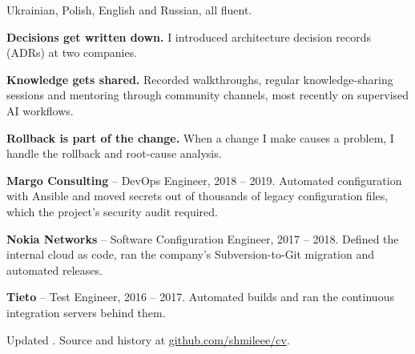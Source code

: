 %
\setlength{\RaggedRightRightskip}{0pt plus 1fil}\raggedright



\smallskip
Ukrainian, Polish, English and Russian, all fluent.

\smallskip
\textbf{Decisions get written down.} I introduced architecture decision
records (ADRs) at two companies.

\smallskip
\textbf{Knowledge gets shared.} Recorded walkthroughs, regular
knowledge-sharing sessions and mentoring through community channels, most
recently on supervised AI workflows.

\smallskip
\textbf{Rollback is part of the change.} When a change I make causes a
problem, I handle the rollback and root-cause analysis.

\smallskip
\textbf{Margo Consulting} -- DevOps Engineer, 2018 -- 2019. Automated
configuration with Ansible and moved secrets out of thousands of legacy
configuration files, which the project's security audit required.

\smallskip
\textbf{Nokia Networks} -- Software Configuration Engineer, 2017 -- 2018.
Defined the internal cloud as code, ran the company's Subversion-to-Git
migration and automated releases.

\smallskip
\textbf{Tieto} -- Test Engineer, 2016 -- 2017. Automated builds and ran the
continuous integration servers behind them.

\bigskip
{\footnotesize Updated \builddate. Source and history at
\href{https://github.com/shmileee/cv}{\uline{github.com/shmileee/cv}}.\par}
